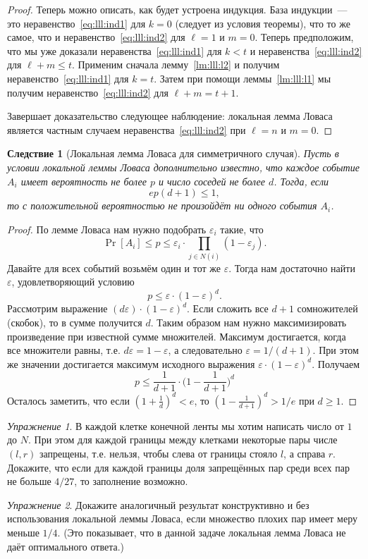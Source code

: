 \documentclass[12pt]{article}
\theoremstyle{definition}
\theoremstyle{plain}
\newtheorem{corollary}{Следствие}[section]
\theoremstyle{remark}
\newtheorem{exercise}{Упражнение}[section]
\begin{document}
\begin{proof}
    Теперь можно описать, как будет устроена индукция. База индукции~--- это неравенство~\eqref{eq:lll:ind1}
    для $k = 0$ (следует из условия теоремы), что то же самое, что и неравенство~\eqref{eq:lll:ind2} для 
    $\ell = 1$ и $m = 0$. 
    Теперь предположим, что мы уже доказали неравенства~\eqref{eq:lll:ind1} для $k < t$ и неравенства~\eqref{eq:lll:ind2} для
    $\ell + m \le t$. Применим сначала лемму~\ref{lm:lll:l2} и получим неравенство~\eqref{eq:lll:ind1} для $k = t$.
    Затем при помощи леммы~\ref{lm:lll:l1} мы получим неравенство~\eqref{eq:lll:ind2} для $\ell + m = t + 1$. 
    
    Завершает доказательство следующее наблюдение: локальная лемма Ловаса является частным случаем
    неравенства~\eqref{eq:lll:ind2} при $\ell = n$ и $m = 0$.
\end{proof}

\begin{corollary}[Локальная лемма Ловаса для симметричного случая]
    Пусть в условии локальной леммы Ловаса дополнительно известно, что каждое событие $A_i$
    имеет вероятность не более $p$ и число соседей не более $d$.
    Тогда, если \[ep(d+1) \le 1,\] то с положительной вероятностью не произойдёт ни одного 
    события $A_i$.
\end{corollary}
\begin{proof}
    По лемме Ловаса нам нужно подобрать $\varepsilon_i$ такие, что 
    \[
        \Pr[A_i] \le p \le \varepsilon_i\cdot\prod_{j\in N(i)}(1-\varepsilon_j). 
    \]
    Давайте для всех событий возьмём один и тот же $\varepsilon$. Тогда нам достаточно
    найти $\varepsilon$, удовлетворяющий условию
    \[
        p \le \varepsilon\cdot(1-\varepsilon)^d. 
    \]
    Рассмотрим выражение $(d\varepsilon)\cdot(1-\varepsilon)^d$. Если сложить все $d+1$
    сомножителей (скобок), то в сумме получится $d$. Таким образом нам нужно максимизировать 
    произведение при известной сумме множителей. Максимум достигается, когда все множители равны, 
    т.е. $d\varepsilon = 1 - \varepsilon$, а следовательно $\varepsilon = 1/(d+1)$. 
    При этом же значении достигается максимум исходного выражения $\varepsilon\cdot(1-\varepsilon)^d$.
    Получаем 
    \[
        p \le \frac{1}{d+1}\cdot\biggl(1-\frac{1}{d+1}\biggr)^d 
    \]
    Осталось заметить, что если $(1 + \frac{1}{d})^d < e$, то $(1-\frac{1}{d+1})^d > 1/e$ при $d\ge1$.
\end{proof}


\begin{exercise}
    В каждой клетке конечной ленты мы хотим написать число от $1$ до $N$. При этом
    для каждой границы между клетками некоторые пары числе $(l,r)$ запрещены,
    т.е. нельзя, чтобы слева от границы стояло $l$, а справа $r$. Докажите,
    что если для каждой границы доля запрещённых пар среди всех пар не больше 
    $4/27$, то заполнение возможно.
\end{exercise}
\begin{exercise}
    Докажите аналогичный результат конструктивно и без использования локальной леммы Ловаса,
    если множество плохих пар имеет меру меньше $1/4$. (Это показывает, что в данной
    задаче локальная лемма Ловаса не даёт оптимального ответа.)
\end{exercise}
\end{document}
